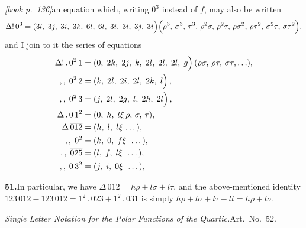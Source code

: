 \documentclass[11pt,a4paper]{article}
\theoremstyle{plain}
\theoremstyle{definition}
\theoremstyle{remark}
\providecommand{\bdet}[1]{\overline{#1}}
\begin{document}
\medskip\noindent\textit{[book p.~136]}\quad an equation which, writing $0^3$ instead of $f$, may also be written
\[
\Delta!\,0^3 = (3l,\;3j,\;3i,\;3k,\;6l,\;6l,\;3i,\;3i,\;3j,\;3i\!\,\Bigl)\Bigl(\rho^3,\,\sigma^3,\,\tau^3,\,\rho^2\sigma,\,\rho^2\tau,\,\rho\sigma^2,\,\rho\tau^2,\,\sigma^2\tau,\,\sigma\tau^2\Bigr),
\]
and I join to it the series of equations
\begin{align*}
\Delta!\,.\,0^2\,1 &= (0,\;2k,\;2j,\;k,\;2l,\;2l,\;2l,\;g\!\,\Bigl)\,(\rho\sigma,\,\rho\tau,\,\sigma\tau,\ldots),\\
,,\;0^2\,2 &= (k,\;2l,\;2i,\;2l,\;2k,\;l\!\,\Bigl)\, ,\\
,,\;0^2\,3 &= (j,\;2l,\;2g,\;l,\;2h,\;2l\!\,\Bigl)\, ,\\
\Delta\,.\,0\,1^2 &= (0,\;h,\;l\!\,\xi\,\rho,\,\sigma,\,\tau),\\
\Delta\,\bdet{012} &= (h,\;l,\;l\!\,\xi\,\ldots\,),\\
,,\;0^2 &= (k,\;0,\;f\!\,\xi\;\,\ldots\,),\\
,,\;\bdet{025} &= (l,\;f,\;l\!\,\xi\;\,\ldots\,),\\
,,\;0\,3^2 &= (j,\;i,\;0\!\,\xi\;\,\ldots\,),
\end{align*}

\medskip\noindent\textbf{51.}\quad In particular, we have $\Delta\,\bdet{012} = h\rho + l\sigma + l\tau$, and the above-mentioned identity $123\,\bdet{012} - \bdet{123}\,012 = 1^2\,.\,023 + 1^2\,.\,031$ is simply $h\rho + l\sigma + l\tau - l\bdet{l} = h\rho + l\sigma$.

\medskip\noindent\textit{Single Letter Notation for the Polar Functions of the Quartic.}\quad Art.\ No.\ 52.
\end{document}
